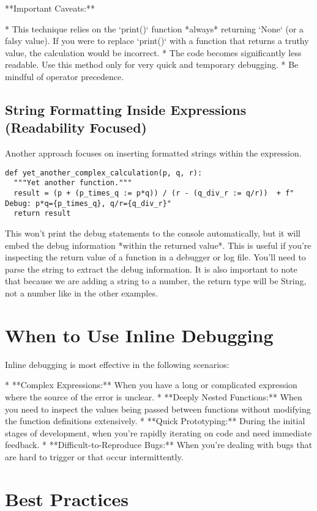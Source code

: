 \documentclass{article}
\begin{document}
**Important Caveats:**

*   This technique relies on the `print()` function *always* returning `None` (or a falsy value).  If you were to replace `print()` with a function that returns a truthy value, the calculation would be incorrect.
*   The code becomes significantly less readable.  Use this method only for very quick and temporary debugging.
*   Be mindful of operator precedence.

\subsection*{String Formatting Inside Expressions (Readability Focused)}

Another approach focuses on inserting formatted strings within the expression.

\begin{verbatim}
def yet_another_complex_calculation(p, q, r):
  """Yet another function."""
  result = (p + (p_times_q := p*q)) / (r - (q_div_r := q/r))  + f" Debug: p*q={p_times_q}, q/r={q_div_r}"
  return result
\end{verbatim}
This won't print the debug statements to the console automatically, but it will embed the debug information *within the returned value*.  This is useful if you're inspecting the return value of a function in a debugger or log file.  You'll need to parse the string to extract the debug information. It is also important to note that because we are adding a string to a number, the return type will be String, not a number like in the other examples.

\section*{When to Use Inline Debugging}

Inline debugging is most effective in the following scenarios:

*   **Complex Expressions:** When you have a long or complicated expression where the source of the error is unclear.
*   **Deeply Nested Functions:** When you need to inspect the values being passed between functions without modifying the function definitions extensively.
*   **Quick Prototyping:**  During the initial stages of development, when you're rapidly iterating on code and need immediate feedback.
*   **Difficult-to-Reproduce Bugs:** When you're dealing with bugs that are hard to trigger or that occur intermittently.

\section*{Best Practices}
\end{document}
